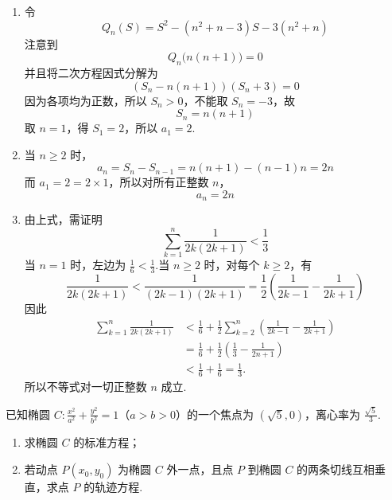 \begin{solution}
\begin{enumerate}
\item 令
\[
Q_n(S)=S^2-(n^2+n-3)S-3(n^2+n)
\]
注意到
\[
Q_n\bigl(n(n+1)\bigr)=0
\]
并且将二次方程因式分解为
\[
\left(S_n-n(n+1)\right)(S_n+3)=0
\]
因为各项均为正数，所以 \(S_n>0\)，不能取 \(S_n=-3\)，故
\[
S_n=n(n+1)
\]
取 \(n=1\)，得 \(S_1=2\)，所以 \(a_1=2\).

\item 当 \(n\geqslant2\) 时，
\[
a_n=S_n-S_{n-1}=n(n+1)-(n-1)n=2n
\]
而 \(a_1=2=2\times1\)，所以对所有正整数 \(n\)，
\[
a_n=2n
\]

\item 由上式，需证明
\[
\sum_{k=1}^{n}\frac{1}{2k(2k+1)}<\frac13
\]
当 \(n=1\) 时，左边为 \(\frac16<\frac13\).当 \(n\geqslant2\) 时，对每个 \(k\geqslant2\)，有
\[
\frac{1}{2k(2k+1)}
<\frac{1}{(2k-1)(2k+1)}
=\frac12\left(\frac{1}{2k-1}-\frac{1}{2k+1}\right)
\]
因此
\[
\begin{aligned}
\sum_{k=1}^{n}\frac{1}{2k(2k+1)}
&<\frac16+\frac12\sum_{k=2}^{n}\left(\frac{1}{2k-1}-\frac{1}{2k+1}\right)\\
&=\frac16+\frac12\left(\frac13-\frac{1}{2n+1}\right)\\
&<\frac16+\frac16=\frac13.
\end{aligned}
\]
所以不等式对一切正整数 \(n\) 成立.
\end{enumerate}
\end{solution}

\begin{problem}
已知椭圆 \(C: \frac{x^2}{a^2} + \frac{y^2}{b^2} = 1\)（\(a > b > 0\)）的一个焦点为 \((\sqrt{5}, 0)\)，离心率为 \(\frac{\sqrt{5}}{3}\).

\begin{enumerate}
\item 求椭圆 \(C\) 的标准方程；
\item 若动点 \(P(x_0, y_0)\) 为椭圆 \(C\) 外一点，且点 \(P\) 到椭圆 \(C\) 的两条切线互相垂直，求点 \(P\) 的轨迹方程.
\end{enumerate}
\end{problem}

